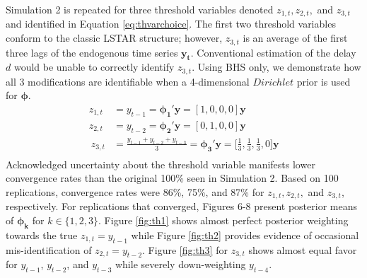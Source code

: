 Simulation 2 is repeated for three threshold variables denoted $z_{1,t},z_{2,t},$ and $z_{3,t}$ and identified in Equation \ref{eq:thvarchoice}. The first two threshold variables conform to the classic LSTAR structure; however, $z_{3,t}$ is an average of the first three lags of the endogenous time series $\bm{y_t}$. Conventional estimation of the delay $d$ would be unable to correctly identify $z_{3,t}$. Using BHS only, we demonstrate how all 3 modifications are identifiable when a 4-dimensional $Dirichlet$ prior is used for $\bm{\phi}$.
 \begin{equation}
\label{eq:thvarchoice}
\begin{split}
	z_{1,t}&=y_{t-1}=\bm{\phi_1}'\bm{y}=[1,0,0,0]\bm{y}\\
	z_{2,t}&=y_{t-2}=\bm{\phi_2}'\bm{y}=[0,1,0,0]\bm{y}\\\
	z_{3,t}&=\frac{y_{t-1}+y_{t-2}+y_{t-3}}{3}=\bm{\phi_3}'\bm{y}=\bigg[\frac{1}{3},\frac{1}{3},\frac{1}{3},0\bigg]\bm{y}\\\
\end{split}
\end{equation}
Acknowledged uncertainty about the threshold variable manifests lower convergence rates than the original 100\% seen in Simulation 2. Based on 100 replications, convergence rates were 86\%, 75\%, and 87\% for  $z_{1,t}, z_{2,t},$ and $z_{3,t}$, respectively. For replications that converged, Figures 6-8 present posterior means of $\bm{\phi_k}$ for $k \in\{1,2,3\}$. Figure \ref{fig:th1} shows almost perfect posterior weighting towards the true $z_{1,t}=y_{t-1}$ while Figure \ref{fig:th2} provides evidence of occasional mis-identification of $z_{2,t}=y_{t-2}$. Figure \ref{fig:th3} for $z_{3,t}$ shows almost equal favor for $y_{t-1}$, $y_{t-2}$,  and $y_{t-3}$ while severely down-weighting $y_{t-4}$.

